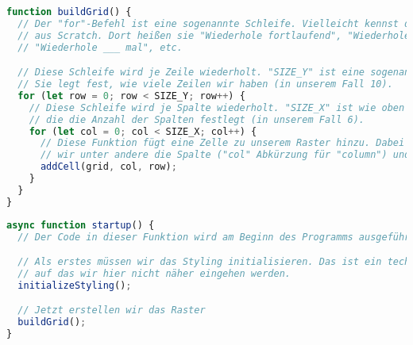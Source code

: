 \documentclass{article}
\begin{document}
    \vspace{0.5cm}
    

    \begin{lstlisting}[language=JavaScript]
function buildGrid() {
  // Der "for"-Befehl ist eine sogenannte Schleife. Vielleicht kennst du Schleifen 
  // aus Scratch. Dort heißen sie "Wiederhole fortlaufend", "Wiederhole bis", 
  // "Wiederhole ___ mal", etc.

  // Diese Schleife wird je Zeile wiederholt. "SIZE_Y" ist eine sogenannte "Konstante".
  // Sie legt fest, wie viele Zeilen wir haben (in unserem Fall 10).
  for (let row = 0; row < SIZE_Y; row++) {
    // Diese Schleife wird je Spalte wiederholt. "SIZE_X" ist wie oben eine Konstante,
    // die die Anzahl der Spalten festlegt (in unserem Fall 6).
    for (let col = 0; col < SIZE_X; col++) {
      // Diese Funktion fügt eine Zelle zu unserem Raster hinzu. Dabei übergeben
      // wir unter andere die Spalte ("col" Abkürzung für "column") und die Zeile ("row").
      addCell(grid, col, row);
    }
  }
}
    \end{lstlisting}

    \newpage


    \begin{lstlisting}[language=JavaScript]
async function startup() {
  // Der Code in dieser Funktion wird am Beginn des Programms ausgeführt.

  // Als erstes müssen wir das Styling initialisieren. Das ist ein technisches Detail,
  // auf das wir hier nicht näher eingehen werden.
  initializeStyling();

  // Jetzt erstellen wir das Raster
  buildGrid();
}
    \end{lstlisting}
\end{document}
